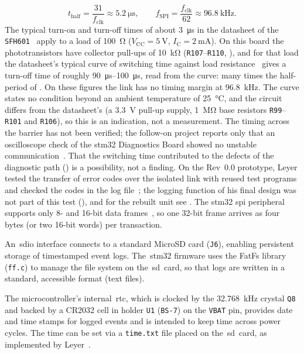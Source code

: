 \begin{description}
\begin{equation}
		      t_\mathrm{half} = \frac{31}{f_\mathrm{clk}} \approx \SI{5.2}{\micro\second}, \qquad f_\mathrm{SPI} = \frac{f_\mathrm{clk}}{62} \approx \SI{96.8}{\kilo\hertz}.
		      \label{eq:spi_clock}
	      \end{equation}
	      The typical turn-on and turn-off times of about \SI{3}{\micro\second} in the datasheet of the \texttt{SFH601}~\cite[p.~3]{vishay_sfh601} apply to a load of \SI{100}{\ohm} ($V_\mathrm{CC} = \SI{5}{\volt}$, $I_\mathrm{C} = \SI{2}{\milli\ampere}$). On this board the phototransistors have collector pull-ups of \SI{10}{\kilo\ohm} (\texttt{R107}--\texttt{R110}, ), and for that load the datasheet's typical curve of switching time against load resistance~\cite[Fig.~14]{vishay_sfh601} gives a turn-off time of roughly \SIrange{90}{100}{\micro\second}, read from the curve: many times the half-period of . On these figures the link has no timing margin at \SI{96.8}{\kilo\hertz}. The curve states no condition beyond an ambient temperature of \SI{25}{\celsius}, and the circuit differs from the datasheet's (a \SI{3.3}{\volt} pull-up supply, \SI{1}{\mega\ohm} base resistors \texttt{R99}--\texttt{R101} and \texttt{R106}), so this is an indication, not a measurement. The timing across the barrier has not been verified; the follow-on project reports only that an oscilloscope check of the \gls{stm32} Diagnostics Board showed no unstable communication~\cite[p.~22]{savchuk2025}. That the switching time contributed to the defects of the diagnostic path () is a possibility, not a finding. On the Rev~0.0 prototype, Leyer tested the transfer of error codes over the isolated link with reused test programs and checked the codes in the log file~\cite[Sec.~4.11]{leyer2023}; the logging function of his final design was not part of this test (), and for the rebuilt unit see . The \gls{stm32} \gls{spi} peripheral supports only 8- and 16-bit data frames~\cite[Sec.~20.2.1]{st_rm0368}, so one 32-bit frame arrives as four bytes (or two 16-bit words) per transaction.
	\item[Data Logging:] An~\gls{sdio} interface connects to a standard MicroSD card (\texttt{J6}), enabling persistent storage of timestamped event logs. The~\gls{stm32} firmware uses the FatFs library (\texttt{ff.c}) to manage the file system on the~\gls{sd}~card, so that logs are written in a standard, accessible format (text files).
	\item[Real-Time Clock (RTC):] The microcontroller's internal~\gls{rtc}, which is clocked by the \SI{32.768}{\kilo\hertz} crystal \texttt{Q8} and backed by a CR2032 cell in holder \texttt{U1} (\texttt{BS-7}) on the \texttt{VBAT} pin, provides date and time stamps for logged events and is intended to keep time across power cycles. The time can be set via a \texttt{time.txt} file placed on the~\gls{sd}~card, as implemented by Leyer~\cite{leyer2023}.

\end{description}
